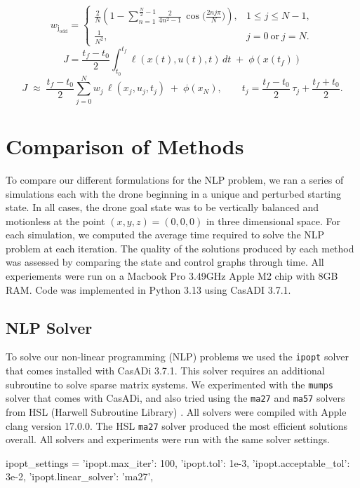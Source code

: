 \documentclass[]{article}
\begin{document}
	\[
        w_{\mathrm{j_{odd}}} =
        \begin{cases}
        \displaystyle
        \frac{2}{N}\!\left(
        1 - \sum_{n=1}^{\frac{N}{2}-1} \frac{2}{4n^{2}-1}\,
        \cos\!\Big(\tfrac{2 n j \pi}{N}\Big)
        \right), & 1 \le j \le N-1, \\[2ex]
        \displaystyle \frac{1}{N^{2}}, & j=0\ \text{or}\ j=N.
        \end{cases}
        \]
        	\[
	J=\frac{t_f-t_0}{2}\int_{t_0}^{t_f} \ell(x(t),u(t),t)\,dt \;+\; \phi(x(t_f))
        \]
        \[
        J \;\approx\; \frac{t_f-t_0}{2} \sum_{j=0}^{N} w_j \,\ell(x_j,u_j,t_j)
        \;+\; \phi(x_N),
        \qquad t_j = \frac{t_f-t_0}{2}\,\tau_j + \frac{t_f+t_0}{2}.
        \]
        	

\section*{Comparison of Methods}

To compare our different formulations for the NLP problem, we ran a series of simulations each with the drone beginning in a unique and perturbed starting state. In all cases, the drone goal state was to be vertically balanced and motionless at the point $(x,y,z) = (0, 0, 0)$ in three dimensional space. For each simulation, we computed the average time required to solve the NLP problem at each iteration. The quality of the solutions produced by each method was assessed by comparing the state and control graphs through time. All experiements were run on a Macbook Pro  3.49GHz Apple M2 chip with 8GB RAM. Code was implemented in Python 3.13 using CasADI 3.7.1. 
	
	\subsection*{NLP Solver}
	To solve our non-linear programming (NLP) problems we used the \texttt{ipopt} solver that comes installed with CasADi 3.7.1.  This solver requires an additional subroutine to  solve sparse matrix systems. We experimented with the \texttt{mumps}  solver that comes with CasADi, and also tried using the  \texttt{ma27} and  \texttt{ma57} solvers  from HSL (Harwell Subroutine Library) \cite{hsl}. All solvers were compiled with Apple clang version 17.0.0. The HSL \texttt{ma27} solver produced the most efficient solutions overall. All solvers and experiments were run with the same solver settings.
	\vspace{\baselineskip}
	\begin{python}
        ipopt_settings = {
			'ipopt.max_iter': 100,                  
			'ipopt.tol': 1e-3,                      	
			'ipopt.acceptable_tol': 3e-2,
			'ipopt.linear_solver': 'ma27',
		}
	\end{python}
\end{document}
